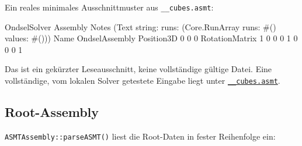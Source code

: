 \documentclass[
  12pt
]{book}
\newenvironment{Shaded}{}{}
\newcommand{\NormalTok}[1]{#1}
\begin{document}
Ein reales minimales Ausschnittmuster aus \texttt{\_\_cubes.asmt}:

\begin{Shaded}
\begin{Highlighting}[]
\NormalTok{OndselSolver}
\NormalTok{Assembly}
\NormalTok{    Notes}
\NormalTok{        (Text string: \textquotesingle{}\textquotesingle{} runs: (Core.RunArray runs: \#() values: \#()))}
\NormalTok{    Name}
\NormalTok{        OndselAssembly}
\NormalTok{    Position3D}
\NormalTok{        0 0 0}
\NormalTok{    RotationMatrix}
\NormalTok{        1 0 0}
\NormalTok{        0 1 0}
\NormalTok{        0 0 1}
\end{Highlighting}
\end{Shaded}

Das ist ein gekürzter Leseausschnitt, keine vollständige gültige Datei.
Eine vollständige, vom lokalen Solver getestete Eingabe liegt unter
\href{./examples/07-ondselsolver-real-asmt/__cubes.asmt}{\texttt{\_\_cubes.asmt}}.

\hypertarget{root-assembly}{%
\subsection*{Root-Assembly}\label{root-assembly}}

\texttt{ASMTAssembly::parseASMT()} liest die Root-Daten in fester
Reihenfolge ein:
\end{document}
